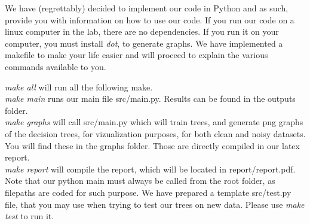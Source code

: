 We have (regrettably) decided to implement our code in Python and as such, provide you with information on how to use our code.
If you run our code on a linux computer in the lab, there are no dependencies. If you run it on your computer, you must install \emph{dot}, to generate graphs.
We have implemented a makefile to make your life easier and will proceed to explain the various commands available to you.

\emph{make all} will run all the following make.\\
\emph{make main} runs our main file  src/main.py. Results can be found in the  outputs folder.\\
\emph{make graphs} will call  src/main.py which will train trees, and generate png graphs of the decision trees, for vizualization purposes,
for both clean and noisy datasets. You will find these in the  graphs folder.
Those are directly compiled in our latex report.\\
\emph{make report} will compile the report, which will be located in report/report.pdf.\\


Note that our python main must always be called from the root folder, as filepaths are coded for such purpose.
We have prepared a template  src/test.py file, that you may use when
trying to test our trees on new data.
Please use  \emph{make test} to run it.




